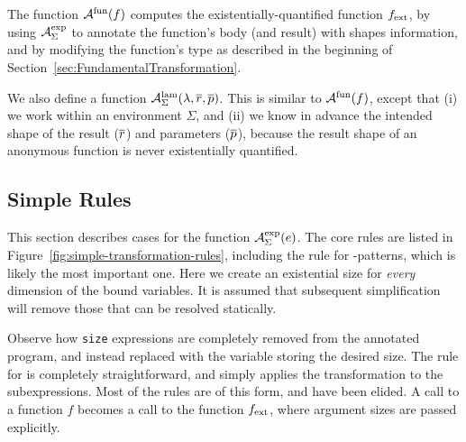 The function \(\mathcal{A}^{\text{fun}}(f)\) computes the existentially-quantified 
function \(f_{\textrm{ext}}\), by using  \(\mathcal{A}_{\Sigma}^{\text{exp}}\) to annotate
the function's body (and result) with shapes information, and by modifying
the function's type as described in the beginning of
Section~\ref{sec:FundamentalTransformation}.

We also define a function
\(\mathcal{A}_{\Sigma}^{\text{lam}}(\lambda,\overline{r},\overline{p})\).  This is similar
to \(\mathcal{A}^{\text{fun}}(f)\), except that (i) we work within an environment
\(\Sigma\), and (ii) we know in advance the intended shape of the
result (\(\overline{r}\)) and parameters (\(\overline{p}\)), because the result
shape of an anonymous function is never existentially quantified.

\subsection{Simple Rules}
\label{sec:SimpleRules}

This section describes cases for the function
\(\mathcal{A}_{\Sigma}^{\text{exp}}(e)\).  The core rules are listed in
Figure~\ref{fig:simple-transformation-rules}, including the rule for
-patterns, which is likely the most important one.  Here we
create an existential size for \textit{every} dimension of the bound
variables.  It is assumed that subsequent simplification will remove
those that can be resolved statically.

Observe how \texttt{size} expressions are completely removed from the
annotated program, and instead replaced with the variable storing the
desired size.  The rule for  is completely straightforward, and
simply applies the transformation to the subexpressions.  Most of the
rules are of this form, and have been elided.  A call to a function
\(f\) becomes a call to the function \(f_{\textrm{ext}}\), where argument
sizes are passed explicitly.

